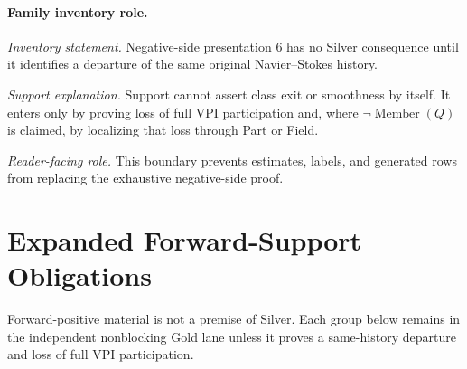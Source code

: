 \paragraph{Family inventory role.}
\emph{Inventory statement.} Negative-side presentation 6 has no Silver consequence until it identifies a departure of the same original Navier--Stokes history.

\emph{Support explanation.} Support cannot assert class exit or smoothness by itself. It enters only by proving loss of full VPI participation and, where \(\neg\operatorname{Member}(Q)\) is claimed, by localizing that loss through Part or Field.

\emph{Reader-facing role.} This boundary prevents estimates, labels, and generated rows from replacing the exhaustive negative-side proof.


\section{Expanded Forward-Support Obligations}

Forward-positive material is not a premise of Silver. Each group below remains in the independent nonblocking Gold lane unless it proves a same-history departure and loss of full VPI participation.

